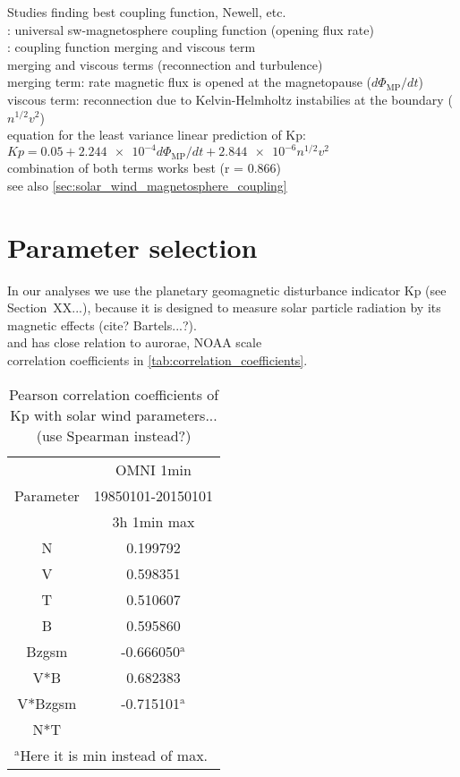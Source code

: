 Studies finding best coupling function, Newell, etc.\\

\citet{Newell2007}: universal sw-magnetosphere coupling function (opening flux rate)\\
\citet{Newell2008}: coupling function merging and viscous term\\
merging and viscous terms (reconnection and turbulence)\\
merging term: rate magnetic flux is opened at the magnetopause ($d\Phi_\text{MP}/dt$)\\
viscous term: reconnection due to Kelvin-Helmholtz instabilies at the boundary ($n^{1/2} v^2$)\\
equation for the least variance linear prediction of Kp: $Kp = 0.05 + \num{2.244e-4} d\Phi_\text{MP}/dt + \num{2.844e-6} n^{1/2} v^2$\\
combination of both terms works best (r = 0.866)\\

see also \autoref{sec:solar_wind_magnetosphere_coupling}\\


\section{Parameter selection}
In our analyses we use the planetary geomagnetic disturbance indicator Kp (see Section~XX...), because it is designed to measure solar particle radiation by its magnetic effects (cite? Bartels...?).\\
and has close relation to aurorae, NOAA scale\\

correlation coefficients in \autoref{tab:correlation_coefficients}.
\begin{table}[htb]\small
	\centering
	\captionsetup{belowskip=4pt}
	\caption{Pearson correlation coefficients of Kp with solar wind parameters... (use Spearman instead?)}
	\begin{tabular}{cc}
		\toprule
			&OMNI 1min\\
		Parameter	&19850101-20150101\\
			&3h 1min max\\
		\midrule
		N	&0.199792\\
		V	&0.598351\\
		T	&0.510607\\
		B	&0.595860\\
		Bzgsm	&-0.666050$^\text{a}$\\
		V*B	&0.682383\\
		V*Bzgsm	&-0.715101$^\text{a}$\\
		N*T	&\\
		\bottomrule
		\multicolumn{2}{l}{\footnotesize{$^\text{a}$Here it is min instead of max.}}
	\end{tabular}
	\label{tab:correlation_coefficients}
\end{table}

